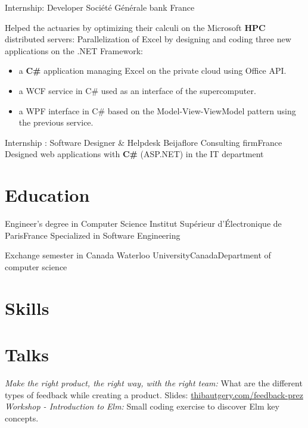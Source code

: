 \documentclass[11pt,a4paper]{moderncv}
\begin{document}
{Internship: Developer}
{Société Générale}
{bank}
{France}
{
Helped the actuaries by optimizing their calculi on the Microsoft \textbf{HPC} distributed servers: 
Parallelization of Excel by designing and coding three new applications on the .NET Framework:
\begin{itemize}
\item a \textbf{C\#} application managing Excel on the private cloud using Office API.
\item a WCF service in C\# used as an interface of the supercomputer. 
\item a WPF interface in C\# based on the Model-View-ViewModel pattern using the previous service.
\end{itemize}
}

{Internship : Software Designer \& Helpdesk}
{Beijaflore}
{Consulting firm}{France}
{Designed web applications with \textbf{C\#} (ASP.NET) in the IT department}


\section{Education}
{Engineer's degree in Computer Science}
{Institut Supérieur d'Électronique de Paris}{France}
{Specialized in Software Engineering}{}

{Exchange semester in Canada}
{Waterloo University}{Canada}{Department of computer science}{}


\section{Skills}
\vspace{1mm}

\section{Talks}
\cvline{}
{
\textit{Make the right product, the right way, with the right team:}
What are the different types of feedback while creating a product. Slides:
\href{http://www.thibautgery.com/feedback-prez}{thibautgery.com/feedback-prez} 
}
\cvline{}
{
\textit{Workshop - Introduction to Elm:}
Small coding exercise to discover Elm key concepts.
}
\end{document}
